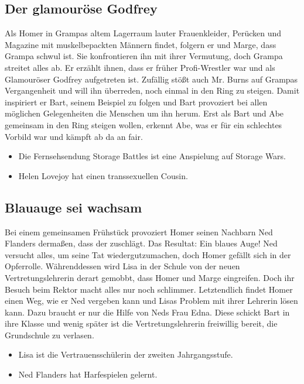 \subsection{Der glamouröse Godfrey}
Als Homer in Grampas altem Lagerraum lauter Frauenkleider, Perücken und Magazine mit muskelbepackten Männern findet, folgern er und Marge, dass Grampa schwul ist. Sie konfrontieren ihn mit ihrer Vermutung, doch Grampa streitet alles ab. Er erzählt ihnen, dass er früher Profi-Wrestler war und als Glamouröser Godfrey aufgetreten ist. Zufällig stößt auch Mr. Burns auf Grampas Vergangenheit und will ihn überreden, noch einmal in den Ring zu steigen. Damit inspiriert er Bart, seinem Beispiel zu folgen und Bart provoziert bei allen möglichen Gelegenheiten die Menschen um ihn herum. Erst als Bart und Abe gemeinsam in den Ring steigen wollen, erkennt Abe, was er für ein schlechtes Vorbild war und kämpft ab da an fair.

\begin{itemize}
	\item Die Fernsehsendung Storage Battles ist eine Anspielung auf Storage Wars.
	\item Helen Lovejoy hat einen transsexuellen Cousin.
\end{itemize}

\subsection{Blauauge sei wachsam}
Bei einem gemeinsamen Frühstück provoziert Homer seinen Nachbarn Ned Flanders dermaßen, dass der zuschlägt. Das Resultat: Ein blaues Auge! Ned versucht alles, um seine Tat wiedergutzumachen, doch Homer gefällt sich in der Opferrolle. Währenddessen wird Lisa in der Schule von der neuen Vertretungslehrerin derart gemobbt, dass Homer und Marge eingreifen. Doch ihr Besuch beim Rektor macht alles nur noch schlimmer. Letztendlich findet Homer einen Weg, wie er Ned vergeben kann und Lisas Problem mit ihrer Lehrerin lösen kann. Dazu braucht er nur die Hilfe von Neds Frau Edna. Diese schickt Bart in ihre Klasse und wenig später ist die Vertretungslehrerin freiwillig bereit, die Grundschule zu verlasen. 

\begin{itemize}
	\item Lisa ist die Vertrauensschülerin der zweiten Jahrgangsstufe.
	\item Ned Flanders hat Harfespielen gelernt.
\end{itemize}

